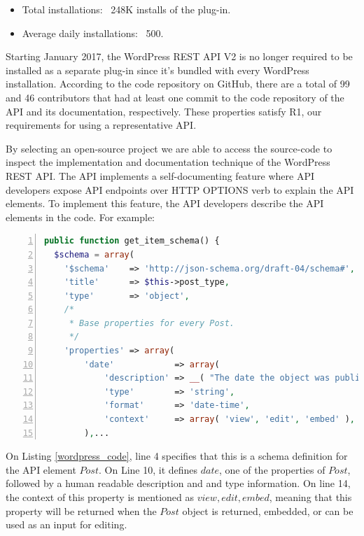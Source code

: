 \documentclass[conference]{IEEEtran}
\begin{document}
\begin{itemize}
  \item Total installations: ~248K installs of the plug-in.
  \item Average daily installations: ~500.
\end{itemize}

Starting January 2017, the WordPress REST API V2 is no longer required to be installed as a separate plug-in since it's bundled with every WordPress installation. According to the code repository on GitHub, there are a total of 99 and 46 contributors that had at least one commit to the code repository of the API and its documentation, respectively. These properties satisfy R1, our requirements for using a representative API.

By selecting an open-source project we are able to access the source-code to inspect the implementation and documentation technique of the WordPress REST API. The API implements a self-documenting feature where API developers expose API endpoints over HTTP OPTIONS verb to explain the API elements. To implement this feature, the API developers describe the API elements in the code. For example:


\lstset{basicstyle=\footnotesize}
\begin{lstlisting}[language=php,breaklines=true,showspaces=false,showstringspaces=false,numbers=left,xleftmargin=2em,caption={Example of self-documenting API Code in PHP},label=wordpress_code]
public function get_item_schema() {
  $schema = array(
    '$schema'    => 'http://json-schema.org/draft-04/schema#',
    'title'      => $this->post_type,
    'type'       => 'object',
    /*
     * Base properties for every Post.
     */
    'properties' => array(
        'date'            => array(
            'description' => __( "The date the object was published, in the site's timezone." ),
            'type'        => 'string',
            'format'      => 'date-time',
            'context'     => array( 'view', 'edit', 'embed' ),
        ),...
\end{lstlisting}

On Listing \ref{wordpress_code}, line 4 specifies that this is a schema definition for the API element $Post$. On Line 10, it defines $date$, one of the properties of $Post$, followed by a human readable description and and type information. On line 14, the context of this property is mentioned as $view, edit, embed$, meaning that this property will be returned when the $Post$ object is returned, embedded, or can be used as an input for editing.
\end{document}
